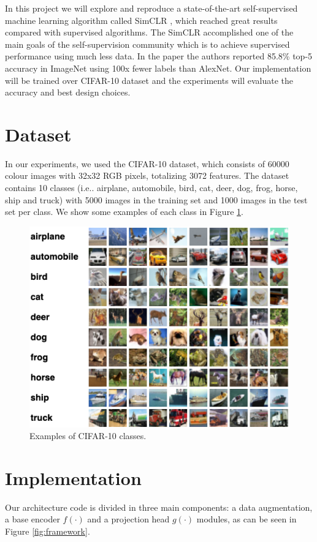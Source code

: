 \documentclass{article}
\makeatletter
\DeclareRobustCommand\onedot{\futurelet\@let@token\@onedot}
\def\@onedot{\ifx\@let@token.\else.\null\fi\xspace}
\def\ie{i.e\onedot} \def\Ie{I.e\onedot}
\makeatother
\begin{document}
In this project we will explore and reproduce a state-of-the-art self-supervised machine learning algorithm called SimCLR \cite{simclr}, which reached great results compared with supervised algorithms. The SimCLR accomplished one of the main goals of the self-supervision community which is to achieve supervised performance using much less data. In the paper the authors reported 85.8\% top-5 accuracy in ImageNet using 100x fewer labels than AlexNet. Our implementation will be trained over CIFAR-10 dataset and the experiments will evaluate the accuracy and best design choices.

\section{Dataset}

In our experiments, we used the CIFAR-10 dataset, which consists of 60000 colour images with 32x32 RGB pixels, totalizing 3072 features. The dataset contains 10 classes (\ie airplane, automobile, bird, cat, deer, dog, frog, horse, ship and truck) with 5000 images in the training set and 1000 images in the test set per class. We show some examples of each class in Figure \ref{fig:cifar}. 

\begin{figure}
  \centering
  \includegraphics[width=0.8\linewidth]{cifar.png}
  \caption{Examples of CIFAR-10 classes.}
  \label{fig:cifar}
\end{figure}

\section{Implementation}

Our architecture code is divided in three main components: a data augmentation, a base encoder $f(\cdot)$ and a projection head $g(\cdot)$ modules, as can be seen in Figure \ref{fig:framework}. 
\end{document}
